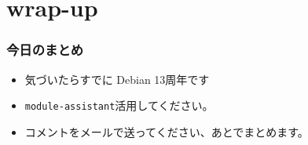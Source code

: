 \documentclass[cjk,dvipdfmx]{beamer}
\begin{document}
\section{wrap-up}
\begin{frame}
 \frametitle{今日のまとめ}
 \begin{itemize}
  \item 気づいたらすでに Debian 13周年です
  \item \texttt{module-assistant}活用してください。	
  \item コメントをメールで送ってください、あとでまとめます。
 \end{itemize}
\end{frame}
\end{document}
